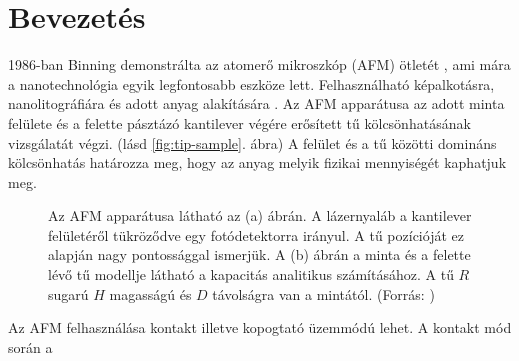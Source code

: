 \section{Bevezetés}
	1986-ban Binning demonstrálta az atomerő mikroszkóp (AFM) ötletét \cite{Binnig1986}, ami mára 
	a nanotechnológia egyik legfontosabb eszköze lett. Felhasználható képalkotásra, nanolitográfiára és 
	adott anyag alakítására \cite{Vasic2013}.
	Az AFM apparátusa az adott minta felülete és a felette pásztázó kantilever végére erősített tű 
	kölcsönhatásának vizsgálatát végzi. (lásd \ref{fig:tip-sample}. ábra)
	A felület és a tű közötti domináns kölcsönhatás határozza meg, hogy az anyag melyik fizikai
	mennyiségét kaphatjuk meg.
	\begin{figure}[H]
		\centering
		\hfil
		\caption{\scriptsize Az AFM apparátusa látható az (a) ábrán. A lázernyaláb
		a kantilever felületéről tükröződve egy fotódetektorra irányul. A tű pozícióját ez alapján nagy pontossággal ismerjük. A
		(b) ábrán a minta és a felette lévő tű modellje látható a kapacitás analitikus számításához.
		A tű $R$ sugarú $H$ magasságú és $D$ távolságra van a mintától. (Forrás: \cite{Butt20051})}
		\label{fig_sim}
	\end{figure}
	Az AFM felhasználása kontakt illetve kopogtató üzemmódú lehet. A kontakt mód során a
